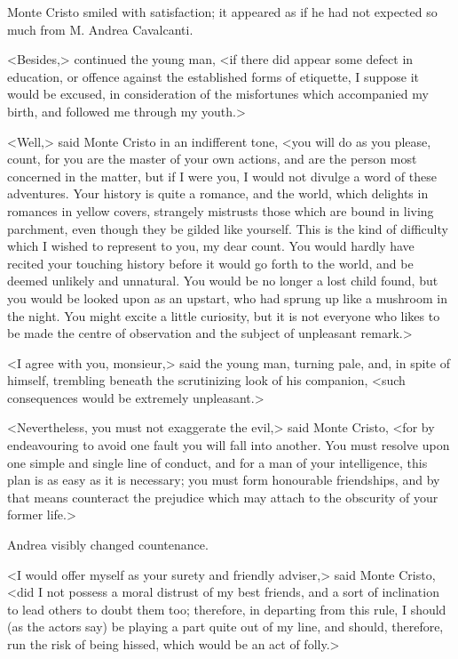  Monte Cristo smiled with satisfaction; it appeared as if he had not expected so much from M. Andrea Cavalcanti. 

 <Besides,> continued the young man, <if there did appear some defect in education, or offence against the established forms of etiquette, I suppose it would be excused, in consideration of the misfortunes which accompanied my birth, and followed me through my youth.> 

 <Well,> said Monte Cristo in an indifferent tone, <you will do as you please, count, for you are the master of your own actions, and are the person most concerned in the matter, but if I were you, I would not divulge a word of these adventures. Your history is quite a romance, and the world, which delights in romances in yellow covers, strangely mistrusts those which are bound in living parchment, even though they be gilded like yourself. This is the kind of difficulty which I wished to represent to you, my dear count. You would hardly have recited your touching history before it would go forth to the world, and be deemed unlikely and unnatural. You would be no longer a lost child found, but you would be looked upon as an upstart, who had sprung up like a mushroom in the night. You might excite a little curiosity, but it is not everyone who likes to be made the centre of observation and the subject of unpleasant remark.> 

 <I agree with you, monsieur,> said the young man, turning pale, and, in spite of himself, trembling beneath the scrutinizing look of his companion, <such consequences would be extremely unpleasant.> 

 <Nevertheless, you must not exaggerate the evil,> said Monte Cristo, <for by endeavouring to avoid one fault you will fall into another. You must resolve upon one simple and single line of conduct, and for a man of your intelligence, this plan is as easy as it is necessary; you must form honourable friendships, and by that means counteract the prejudice which may attach to the obscurity of your former life.> 

 Andrea visibly changed countenance. 

 <I would offer myself as your surety and friendly adviser,> said Monte Cristo, <did I not possess a moral distrust of my best friends, and a sort of inclination to lead others to doubt them too; therefore, in departing from this rule, I should (as the actors say) be playing a part quite out of my line, and should, therefore, run the risk of being hissed, which would be an act of folly.> 

